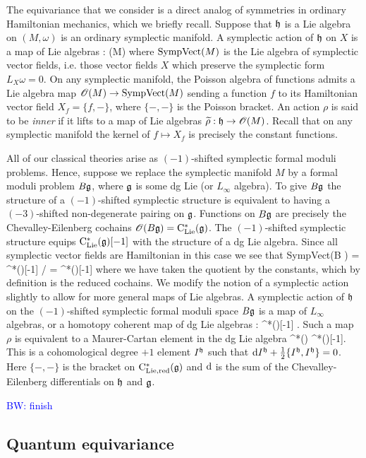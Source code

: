\documentclass[10pt]{amsart}
\def\brian{\textcolor{blue}{BW: }\textcolor{blue}}
\begin{document}
The equivariance that we consider is a direct analog of symmetries in ordinary Hamiltonian mechanics, which we briefly recall. 
Suppose that $\mathfrak h$ is a Lie algebra on $(M,\omega)$ is an ordinary symplectic manifold. 
A symplectic action of $\mathfrak h$ on $X$ is a map of Lie algebras 
\ben
\rho : \fh {}(M)
\een
where ${\rm SympVect}(M)$ is the Lie algebra of symplectic vector fields, i.e. those vector fields $X$ which preserve the symplectic form $L_X \omega = 0$.
On any symplectic manifold, the Poisson algebra of functions admits a Lie algebra map $\mathscr O(M) \to {\rm SympVect}(M)$ sending a function $f$ to its Hamiltonian vector field $X_f = \{f,-\}$, where $\{-,-\}$ is the Poisson bracket.
An action $\rho$ is said to be {\em inner} if it lifts to a map of Lie algebras $\widetilde{\rho} : \mathfrak h \to \mathscr O(M)$. 
Recall that on any symplectic manifold the kernel of $f \mapsto X_f$ is precisely the constant functions. 

All of our classical theories arise as $(-1)$-shifted symplectic formal moduli problems.
Hence, suppose we replace the symplectic manifold $M$ by a formal moduli problem $B \mathfrak g$, where $\mathfrak g$ is some dg Lie (or $L_\infty$ algebra). 
To give $B \mathfrak g$ the structure of a $(-1)$-shifted symplectic structure is equivalent to having a $(-3)$-shifted non-degenerate pairing on $\mathfrak g$. 
Functions on $B\mathfrak g$ are precisely the Chevalley-Eilenberg cochains $\mathscr O(B\mathfrak g) = {\rm C}_{{\rm Lie}}^*(\mathfrak g)$. 
The $(-1)$-shifted symplectic structure equips ${\rm C}_{{\rm Lie}}^*(\mathfrak g) [-1]$ with the structure of a dg Lie algebra.
Since all symplectic vector fields are Hamiltonian in this case we see that 
\ben
{\rm SympVect}(B \fg) = \clie^*(\fg)[-1] / \CC = \cred^*(\fg)[-1]
\een
where we have taken the quotient by the constants, which by definition is the reduced cochains. 
We modify the notion of a symplectic action slightly to allow for more general maps of Lie algebras.
A symplectic action of $\mathfrak h$ on the $(-1)$-shifted symplectic formal moduli space $B \mathfrak g$ is a map of $L_\infty$ algebras, or a homotopy coherent map of dg Lie algebras
\ben
\rho : \fh \rightsquigarrow \cred^*(\fg)[-1] .
\een
Such a map $\rho$ is equivalent to a Maurer-Cartan element in the dg Lie algebra
\ben
\clie^*(\fh) \tensor \cred^*(\fg)[-1].
\een
This is a cohomological degree $+1$ element $I^\mathfrak h$ such that ${\rm d} I^\mathfrak h + \frac{1}{2}\{I^\mathfrak h, I^\mathfrak h\} = 0$.
Here $\{-,-\}$ is the bracket on ${\rm C}_{\rm Lie, red}^*(\mathfrak g)$ and ${\rm d}$ is the sum of the Chevalley-Eilenberg differentials on $\mathfrak h$ and $\mathfrak g$. 

\brian{finish}

\subsection{Quantum equivariance}
\end{document}
